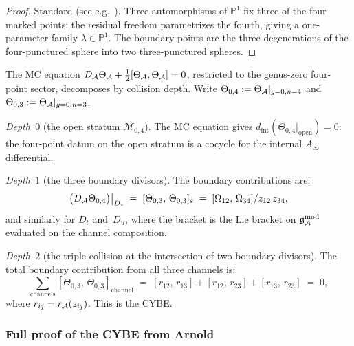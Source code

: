 \begin{proof}
Standard (see e.g.~\cite{Kn83}). Three automorphisms of
$\mathbb{P}^1$ fix three of the four marked points; the residual
freedom parametrizes the fourth, giving a one-parameter family
$\lambda \in \mathbb{P}^1$. The boundary points are the three
degenerations of the four-punctured sphere into two three-punctured
spheres.
\end{proof}

\begin{construction}
The MC equation
$D_{\mathcal{A}}\Theta_{\mathcal{A}} + \tfrac{1}{2}[\Theta_{\mathcal{A}},\Theta_{\mathcal{A}}] = 0$,
restricted to the genus-zero four-point sector, decomposes by
collision depth. Write
$\Theta_{0,4} := \Theta_{\mathcal{A}}|_{g=0,n=4}$ and
$\Theta_{0,3} := \Theta_{\mathcal{A}}|_{g=0,n=3}$.

\emph{Depth~$0$} (the open stratum $\mathcal{M}_{0,4}$).
The MC equation gives
$d_{\mathrm{int}}(\Theta_{0,4}|_{\mathrm{open}}) = 0$:
the four-point datum on the open stratum is a cocycle for the
internal $A_\infty$ differential.

\emph{Depth~$1$} (the three boundary divisors).
The boundary contributions are:
\begin{equation}%
\bigl(D_\cA\Theta_{0,4}\bigr)\big|_{D_s}
\;=\;
[\Theta_{0,3},\,\Theta_{0,3}]_s
\;=\;
[\Omega_{12},\,\Omega_{34}]/z_{12}\,z_{34},
\end{equation}
and similarly for $D_t$ and~$D_u$, where the bracket is the
Lie bracket on $\mathfrak{g}_{\mathcal{A}}^{\mathrm{mod}}$ evaluated on the channel composition.

\emph{Depth~$2$} (the triple collision at the intersection of two
boundary divisors).
The total boundary contribution from all three channels is:
\begin{equation}%
\sum_{\text{channels}}
[\Theta_{0,3},\,\Theta_{0,3}]_{\text{channel}}
\;=\;
[r_{12},\,r_{13}] + [r_{12},\,r_{23}] + [r_{13},\,r_{23}]
\;=\; 0,
\end{equation}
where $r_{ij} = r_{\mathcal{A}}(z_{ij})$. This is the CYBE.
\end{construction}


\subsubsection{Full proof of the CYBE from Arnold}

